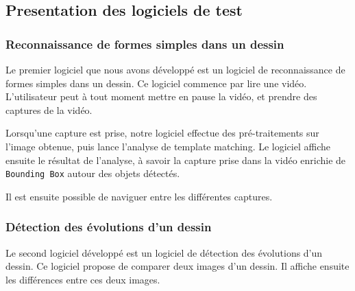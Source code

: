 \subsection{Presentation des logiciels de test}

\subsubsection{Reconnaissance de formes simples dans un dessin}

Le premier logiciel que nous avons développé est un logiciel de reconnaissance de formes simples dans un dessin. Ce logiciel commence par lire une vidéo. L'utilisateur peut à tout moment mettre en pause la vidéo, et prendre des captures de la vidéo.

Lorsqu'une capture est prise, notre logiciel effectue des pré-traitements sur l'image obtenue, puis lance l'analyse de template matching. Le logiciel affiche ensuite le résultat de l'analyse, à savoir la capture prise dans la vidéo enrichie de \texttt{Bounding Box} autour des objets détectés.

Il est ensuite possible de naviguer entre les différentes captures.

\subsubsection{Détection des évolutions d'un dessin}

Le second logiciel développé est un logiciel de détection des évolutions d'un dessin.
Ce logiciel propose de comparer deux images d'un dessin. Il affiche ensuite les différences entre ces deux images.
